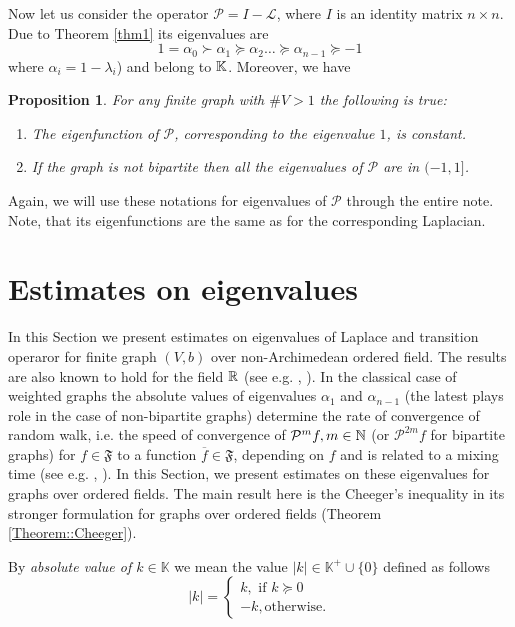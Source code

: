 \documentclass[a4paper,12pt]{amsart}
\newtheorem{proposition}{Proposition}
\theoremstyle{definition}
\DeclareMathOperator\lspan{span}
\renewcommand{\P}{\mathcal{P}}
\newcommand{\K}{\mathbb{K}}
\begin{document}
Now let us consider the operator $\mathcal P=I-\mathcal L$, where $I$ is an identity matrix $n\times n$.  Due to Theorem \ref{thm1} its  eigenvalues are
$$
\boxed{1=\alpha_0\succ\alpha_1\succeq\alpha_2\dots\succeq \alpha_{n-1}\succeq-1}
$$
where $\alpha_i=1-\lambda_i$) and belong to $\Bbb K$.  Moreover, we have
\begin{proposition}
For any finite graph with $\#V>1$ the following is true:
\begin{enumerate}
\item
The eigenfunction of  $\mathcal P$, corresponding to the eigenvalue $1$, is constant.
\item
If the graph is not bipartite then all the eigenvalues of $\mathcal P$ are in $(-1,1]$.
\end{enumerate}
\end{proposition}
Again, we will use these notations for eigenvalues of $\P$ through the entire note. Note, that its eigenfunctions are the same as for the corresponding Laplacian.




\section{Estimates on eigenvalues}
In this Section we present estimates on eigenvalues of Laplace and transition operaror for finite graph $(V,b)$ over non-Archimedean ordered field. The results are also known to hold for the field $\Bbb R$ (see e.g. \cite{BauerJost}, \cite{Grigoryan}).
In the classical case of weighted graphs the absolute values of eigenvalues $\alpha_1$ and $\alpha_{n-1}$ (the latest plays role in the case of non-bipartite graphs) determine the rate of convergence of random walk, i.e. the speed of convergence of $\P ^m f, m\in \Bbb N$ (or $\P ^{2m} f$ for bipartite graphs) for $f\in\mathfrak F$ to a function $\overline f\in \mathfrak F$, depending on $f$ and is related to a mixing time (see e.g. \cite{Grigoryan}, \cite{LPW}).
In this Section, we present estimates on these eigenvalues for graphs over ordered fields. The main result here is the Cheeger's inequality in its stronger formulation for graphs over ordered fields (Theorem \ref{Theorem::Cheeger}).

By \emph{absolute value of $k\in \K$} we mean the value $|k|\in \K^+\cup\{0\}$ defined as follows
\begin{equation*}
|k|=\begin{cases}
k, \mbox{ if }k\succeq 0\\
-k, \mbox{otherwise.}
\end{cases}
\end{equation*}
\end{document}
